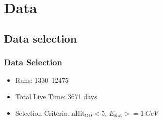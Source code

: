 \documentclass{beamer}
\begin{document}
\section{Data}
\subsection{Data selection}
\begin{frame}
	\frametitle{Data Selection}
	\begin{itemize}
		\item Runs: \numrange{1330}{12475}
		\item Total Live Time: 3671 days
		\item Selection Criteria: $\mathrm{nHit}_{\mathrm{OD}} < 5$,
			$E_{\mathrm{Kat}} >= \SI{1}{GeV}$
	\end{itemize}
\end{frame}
\end{document}

